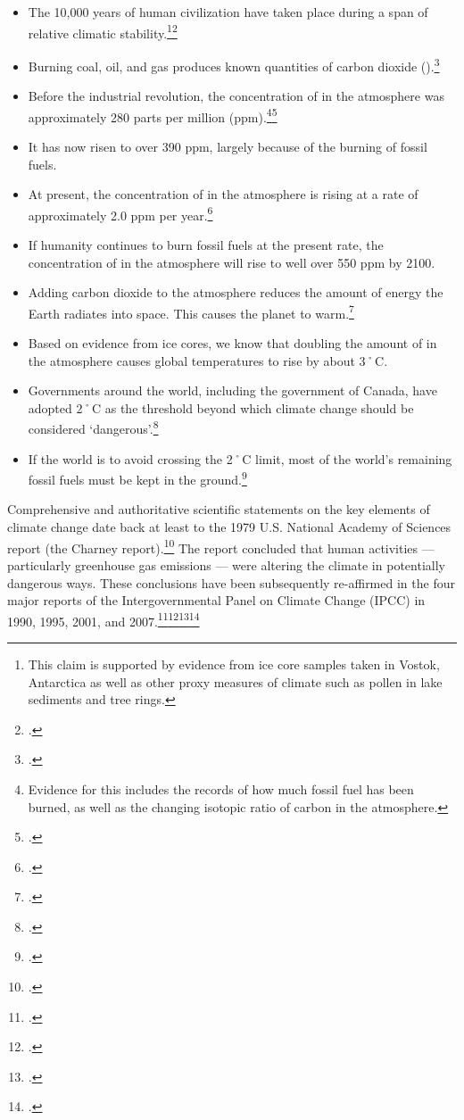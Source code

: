 \begin{itemize}
	\item The 10,000 years of human civilization have taken place during a span of relative climatic stability.\footnote{This claim is supported by evidence from ice core samples taken in Vostok, Antarctica as well as other proxy measures of climate such as pollen in lake sediments and tree rings.}\footcite[][p. 4]{Alley2000}
	\item Burning coal, oil, and gas produces known quantities of carbon dioxide ().\footcite[For example, the U.S. Environmental Protection Agency lists quantities of  produced by burning a barrel of oil, metric tonne of coal, or therm of natural gas:][]{CalculationsReferences}
	\item Before the industrial revolution, the concentration of  in the atmosphere was approximately 280 parts per million (ppm).\footnote{Evidence for this includes the records of how much fossil fuel has been burned, as well as the changing isotopic ratio of carbon in the atmosphere.}\footcite[][]{IPCC4ARdrivers}
	\item It has now risen to over 390 ppm, largely because of the burning of fossil fuels.
	\item At present, the concentration of  in the atmosphere is rising at a rate of approximately 2.0 ppm per year.\footcite[][]{NOAATrends}
	\item If humanity continues to burn fossil fuels at the present rate, the concentration of  in the atmosphere will rise to well over 550 ppm by 2100.
	\item Adding carbon dioxide to the atmosphere reduces the amount of energy the Earth radiates into space. This causes the planet to warm.\footcite[][]{IPCC4ARdrivers}
	\item Based on evidence from ice cores, we know that doubling the amount of  in the atmosphere causes global temperatures to rise by about 3˚C.
	\item Governments around the world, including the government of Canada, have adopted 2˚C as the threshold beyond which climate change should be considered `dangerous'.\footcite{CopenhagenAccord}
	\item If the world is to avoid crossing the 2˚C limit, most of the world's remaining fossil fuels must be kept in the ground.\footcite[][]{IEA2012}
\end{itemize}



Comprehensive and authoritative scientific statements on the key elements of climate change date back at least to the 1979 U.S. National Academy of Sciences report (the Charney report).\footcite[][]{Charney1979}
The report concluded that human activities --- particularly greenhouse gas emissions --- were altering the climate in potentially dangerous ways. These conclusions have been subsequently re-affirmed in the four major reports of the Intergovernmental Panel on Climate Change (IPCC) in 1990, 1995, 2001, and 2007.\footcite[][]{IPCC1990}\footcite[][]{IPCC1995}\footcite[][]{IPCC2001}\footcite[][]{IPCC2007}



